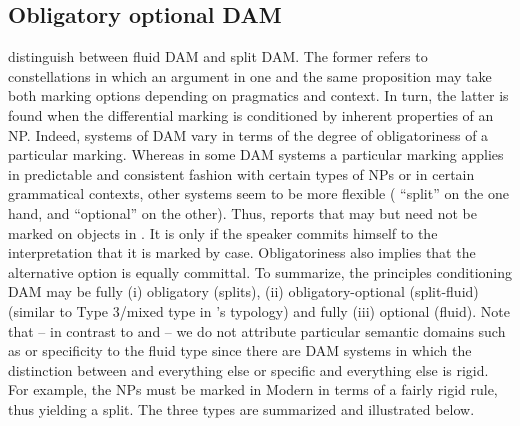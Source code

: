 \documentclass[output=paper]{LSP/langsci}
\begin{document}
\subsection{Obligatory \vs optional DAM}
\label{01-wi-sec:3.4-Obligatory}
 distinguish between fluid DAM and split DAM. 
The former refers to constellations in which an argument in one and the same proposition may take both marking options depending on pragmatics and context. 
In turn, the latter is found when the differential marking is conditioned by inherent properties of an NP. 
Indeed, systems of DAM vary in terms of the degree of obligatoriness of a particular marking. 
Whereas in some DAM systems a particular marking applies in predictable and consistent fashion with certain types of NPs or in certain grammatical contexts, other systems seem to be more flexible (\cf {} “split”  on the one hand, and “optional”  on the other). 
Thus, \citet{deSwart2006Case} reports that  may but need not be marked on objects in . 
It is only if the speaker commits himself to the  interpretation that it is marked by case. 
Obligatoriness also implies that the alternative option is equally committal. 
To summarize, the principles conditioning DAM may be fully (i) obligatory (splits), (ii) obligatory-optional (split-fluid) (similar to Type 3/mixed type in \citeauthor{Dalrympleetal2011Objects}'s \citeyear{Dalrympleetal2011Objects} typology) and fully (iii) optional (fluid). 
Note that – in contrast to \citet{deHoopetal2007Fluid} and \citet{Kleinetal2011Case} – we do not attribute particular semantic domains such as  or specificity to the fluid type since there are DAM systems in which the distinction between  and everything else or specific and everything else is rigid. 
For example, the  NPs must be marked in Modern  in terms of a fairly rigid rule, thus yielding a split. 
The three types are summarized and illustrated below.
\end{document}
